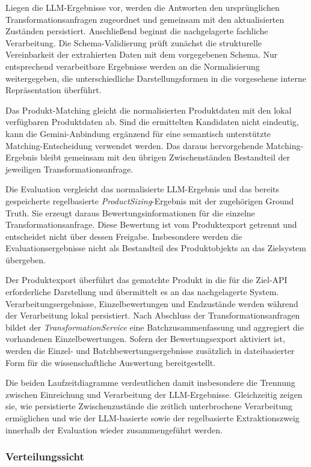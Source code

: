 Liegen die LLM-Ergebnisse vor, werden die Antworten den ursprünglichen Transformationsanfragen zugeordnet und gemeinsam mit den aktualisierten Zuständen persistiert. 
Anschließend beginnt die nachgelagerte fachliche Verarbeitung. Die Schema-Validierung prüft zunächst die strukturelle Vereinbarkeit der extrahierten Daten mit dem 
vorgegebenen Schema. Nur entsprechend verarbeitbare Ergebnisse werden an die Normalisierung weitergegeben, die unterschiedliche Darstellungsformen in die vorgesehene 
interne Repräsentation überführt.

Das Produkt-Matching gleicht die normalisierten Produktdaten mit den lokal verfügbaren Produktdaten ab. Sind die ermittelten Kandidaten nicht eindeutig, kann die 
Gemini-Anbindung ergänzend für eine semantisch unterstützte Matching-Entscheidung verwendet werden. Das daraus hervorgehende Matching-Ergebnis bleibt gemeinsam mit den 
übrigen Zwischenständen Bestandteil der jeweiligen Transformationsanfrage.

Die Evaluation vergleicht das normalisierte LLM-Ergebnis und das bereits gespeicherte regelbasierte \textit{ProductSizing}-Ergebnis mit der zugehörigen Ground Truth. Sie 
erzeugt daraus Bewertungsinformationen für die einzelne Transformationsanfrage. Diese Bewertung ist vom Produktexport getrennt und entscheidet nicht über dessen Freigabe. 
Insbesondere werden die Evaluationsergebnisse nicht als Bestandteil des Produktobjekts an das Zielsystem übergeben.

Der Produktexport überführt das gematchte Produkt in die für die Ziel-API erforderliche Darstellung und übermittelt es an das nachgelagerte System. Verarbeitungsergebnisse, 
Einzelbewertungen und Endzustände werden während der Verarbeitung lokal persistiert. Nach Abschluss der Transformationsanfragen bildet der \textit{TransformationService} 
eine Batchzusammenfassung und aggregiert die vorhandenen Einzelbewertungen. Sofern der Bewertungsexport aktiviert ist, werden die Einzel- und Batchbewertungsergebnisse 
zusätzlich in dateibasierter Form für die wissenschaftliche Auswertung bereitgestellt.

Die beiden Laufzeitdiagramme verdeutlichen damit insbesondere die Trennung zwischen Einreichung und Verarbeitung der LLM-Ergebnisse. Gleichzeitig zeigen sie, wie persistierte 
Zwischenzustände die zeitlich unterbrochene Verarbeitung ermöglichen und wie der LLM-basierte sowie der regelbasierte Extraktionszweig innerhalb der Evaluation wieder 
zusammengeführt werden.

\subsubsection{Verteilungssicht}


